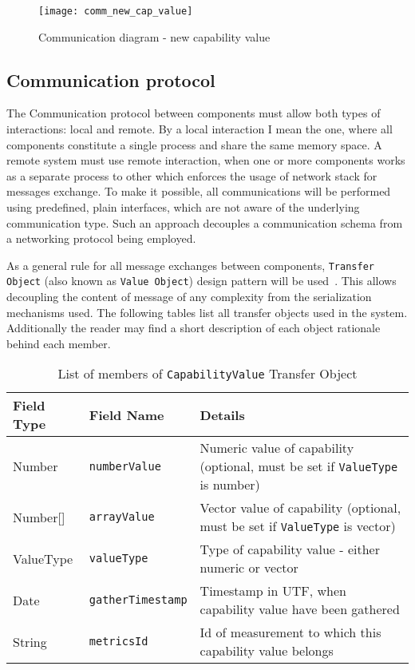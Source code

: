 \begin{figure}[ht]
\centering
\texttt{[image: comm\_new\_cap\_value]}
\caption{Communication diagram - new capability value}
\label{fig:comm_new_cap_value}
\end{figure}


\subsection{Communication protocol}
\label{subsec:arch_comm_protocol}

The Communication protocol between components must allow both types of interactions: local and remote. By a local interaction I mean the one, where all components constitute a single process and share the same memory space. A remote system must use remote interaction, when one or more components works as a separate process to other which enforces the usage of network stack for messages exchange. To make it possible, all communications will be performed using predefined, plain interfaces, which are not aware of the underlying communication type. Such an approach decouples a communication schema from a networking protocol being employed.

As a general rule for all message exchanges between components, \texttt{Transfer Object} (also known as \texttt{Value Object}) design pattern will be used~\cite{0131422464}. This allows decoupling the content of message of any complexity from the serialization mechanisms used. The following tables list all transfer objects used in the system. Additionally the reader may find a short description of each object rationale behind each member. 

\renewcommand*\arraystretch{1.2}

\begin{table}[ht] %
\begin{tabular}{| m{} | m{} | m{} |}
\hline 
\cellcolor[gray]{0.9} Field Type & \cellcolor[gray]{0.9} Field Name & \cellcolor[gray]{0.9} Details \\
\hline 
Number & \texttt{numberValue} & Numeric value of capability (optional, must be set if \texttt{ValueType} is number) \\
Number[] & \texttt{arrayValue} & Vector value of capability (optional, must be set if \texttt{ValueType} is vector) \\
ValueType & \texttt{valueType} & Type of capability value - either numeric or vector\\
Date & \texttt{gatherTimestamp} & Timestamp in UTF, when capability value have been gathered \\
String & \texttt{metricsId} & Id of measurement to which this capability value belongs \\
\hline 
\end{tabular}
\caption{List of members of \texttt{CapabilityValue} Transfer Object}
\label{tab:TO_CapValue}
\end{table} %

